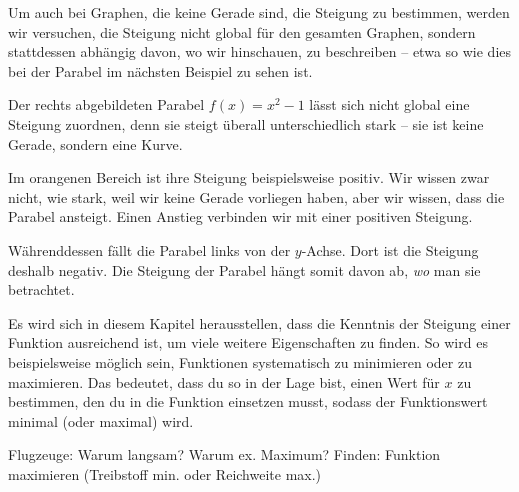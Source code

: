 \documentclass[../../main.tex]{subfiles}
\begin{document}
Um auch bei Graphen, die keine Gerade sind, die Steigung zu bestimmen, werden wir versuchen, die Steigung nicht global für den gesamten Graphen, sondern stattdessen abhängig davon, wo wir hinschauen, zu beschreiben -- etwa so wie dies bei der Parabel im nächsten Beispiel zu sehen ist.


\begin{example}{}
    
    Der rechts abgebildeten Parabel $f(x)=x^2-1$ lässt sich nicht global eine Steigung zuordnen, denn sie steigt überall unterschiedlich stark -- sie ist keine Gerade, sondern eine Kurve. 
    
    Im orangenen Bereich ist ihre Steigung beispielsweise positiv. Wir wissen zwar nicht, wie stark, weil wir keine Gerade vorliegen haben, aber wir wissen, dass die Parabel ansteigt. Einen Anstieg verbinden wir mit einer positiven Steigung. 
    
    Währenddessen fällt die Parabel links von der $y$-Achse. Dort ist die Steigung deshalb negativ. Die Steigung der Parabel hängt somit davon ab, \emph{wo} man sie betrachtet.
\end{example}

Es wird sich in diesem Kapitel herausstellen, dass die Kenntnis der Steigung einer Funktion ausreichend ist, um viele weitere Eigenschaften zu finden. So wird es beispielsweise möglich sein, Funktionen systematisch zu minimieren oder zu maximieren. Das bedeutet, dass du so in der Lage bist, einen Wert für $x$ zu bestimmen, den du in die Funktion einsetzen musst, sodass der Funktionswert minimal (oder maximal) wird.

Flugzeuge: Warum langsam? Warum ex. Maximum? Finden: Funktion maximieren (Treibstoff min. oder Reichweite max.)
\end{document}
